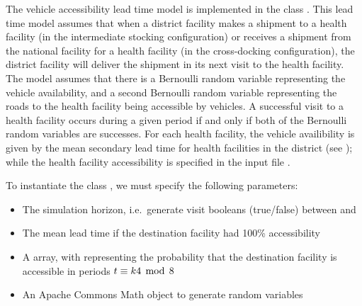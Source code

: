 The vehicle accessibility lead time model is implemented
in the class .
This lead time model assumes that
when a district facility makes a shipment to a health facility
(in the intermediate stocking configuration)
or receives a shipment from the national facility for a health facility
(in the cross-docking configuration),
the district facility will deliver the shipment
in its next visit to the health facility.
The model assumes that
there is a Bernoulli random variable representing the vehicle availability,
and a second Bernoulli random variable representing
the roads to the health facility being accessible by vehicles.
A successful visit to a health facility
occurs during a given period
if and only if both of the Bernoulli random variables are successes.
For each health facility,
the vehicle availibility is given by the mean secondary lead time
for health facilities in the district (see );
while the health facility accessibility
is specified in the input file .

To instantiate the class ,
we must specify the following parameters:
\begin{itemize}
\item The simulation horizon,
i.e.\ generate visit booleans (true/false)
between  and 
\item {} The mean lead time if the destination facility
had 100\% accessibility
\item {}
A  array,
with  representing the probability that
the destination facility is accessible in periods $t \equiv k 4\,\bmod\,8$
\item {}
An Apache Commons Math  object
to generate random variables
\end{itemize}

